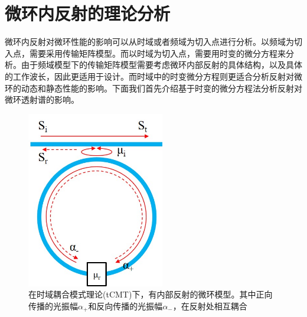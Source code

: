 \section{微环内反射的理论分析}
微环内反射对微环性能的影响可以从时域或者频域为切入点进行分析。以频域为切入点，需要采用传输矩阵模型\cite{yariv2006photonics}。而以时域为切入点，需要用时变的微分方程来分析\cite{haus1984waves}。由于频域模型下的传输矩阵模型需要考虑微环内部反射的具体结构，以及具体的工作波长，因此更适用于设计。而时域中的时变微分方程则更适合分析反射对微环的动态和静态性能的影响。下面我们首先介绍基于时变的微分方程法分析反射对微环透射谱的影响\cite{haus1984waves,Li2016design,little1997microring}。
\begin{figure}[htb]
	\centering
	\includegraphics[width=6cm]{./Pictures/chapt5_ring_reflector_structure.jpg}
	\caption{在时域耦合模式理论(tCMT)下，有内部反射的微环模型。其中正向传播的光振幅$\alpha_+$和反向传播的光振幅$\alpha_-$，在反射处相互耦合}
	\label{chapt5_ring_reflector_structure}
\end{figure}

